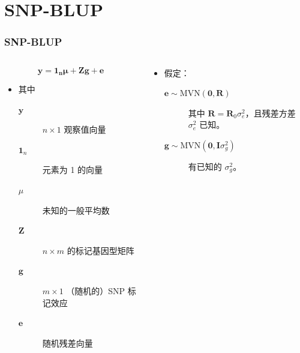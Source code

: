 \documentclass[serif,aspectratio=169]{beamer}
\begin{document}
\section{SNP-BLUP}
\begin{frame}
  \frametitle{SNP-BLUP}
  \begin{columns}
    \begin{column}{.5\textwidth}
      $$\mathbf{y=1_n\mu+Zg+e}$$
      \begin{itemize}
      \item 其中
        \begin{description}
        \item [$\mathbf{y}$] $n\times 1$ 观察值向量
        \item [$\mathbf{1}_n$] 元素为 1 的向量
        \item [$\mu$] 未知的一般平均数
        \item [$\mathbf{Z}$] $n\times m$ 的标记基因型矩阵
        \item [$\mathbf{g}$] $m\times 1$ （随机的）SNP 标记效应
        \item [$\mathbf{e}$] 随机残差向量
        \end{description}
      \end{itemize}
    \end{column}

    \begin{column}{.5\textwidth}
      \begin{itemize}
      \item 假定：
        \begin{description}
        \item [$\mathbf{e}\sim\mathrm{MVN}(\mathbf{0}, \mathbf{R})$] 其中 $\mathbf{R=R}_0\sigma_e^2$，且残差方差 $\sigma_e^2$ 已知。
        \item [$\mathbf{g}\sim\mathrm{MVN}(\mathbf{0}, \mathbf{I}\sigma_g^2)$] 有已知的 $\sigma_g^2$。
        \end{description}
      \end{itemize}
    \end{column}
  \end{columns}
\end{frame}
\end{document}
